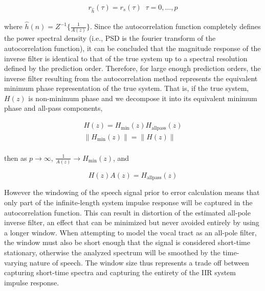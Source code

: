 

\begin{eqnarray}
	r_{\hat{h}}(\tau) = r_s(\tau) \;\; \tau=0, \dots, p
\end{eqnarray}

\noindent
where $\hat{h}(n)=Z^{-1}\{\frac{1}{A(z)}\}$. Since the autocorrelation function completely defines the power spectral density (i.e., PSD is the fourier transform of the autocorrelation function), it can be concluded that the magnitude response of the inverse filter is identical to that of the true system up to a spectral resolution defined by the prediction order. Therefore, for large enough prediction orders, the inverse filter resulting from the autocorrelation method represents the equivalent minimum phase representation of the true system. That is, if the true system, $H(z)$ is non-minimum phase and we decompose it into its equivalent minimum phase and all-pass components,

\begin{eqnarray}
	H(z) = H_{\mathrm{min}}(z) H_{\mathrm{allpass}}(z) \\
	\| H_{\mathrm{min}}(z) \| = \| H(z) \|  \\
\end{eqnarray}

\noindent
then as $p \rightarrow \infty$, $\frac{1}{A(z)} \rightarrow H_{\mathrm{min}}(z)$, and

\begin{equation}
	H(z) A(z) = H_{\mathrm{allpass}}(z) 
\end{equation}

However the windowing of the speech signal prior to error calculation means that only part of the infinite-length system impulse response will be captured in the autocorrelation function. This can result in distortion of the estimated all-pole inverse filter, an effect that can be minimized but never avoided entirely by using a longer window. When attempting to model the vocal tract as an all-pole filter, the window must also be short enough that the signal is considered short-time stationary, otherwise the analyzed spectrum will be smoothed by the time-varying nature of speech. The window size thus represents a trade off between capturing short-time spectra and capturing the entirety of the IIR system impulse response. 

